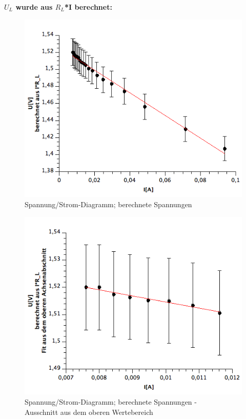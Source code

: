 \documentclass[12pt,a4paper]{article}
\begin{document}
\textbf{$U_L$ wurde aus $R_L$*I berechnet:}



\begin{figure}[H]
	\centering
	\includegraphics[scale=0.58]{./figure/Batterie_RI-I_mitFit.png}
	\caption{Spannung/Strom-Diagramm; berechnete Spannungen}
	\label{fig:Batterie_RI-I_mitFit}
\end{figure}



\begin{figure}[H]
	\centering
	\includegraphics[scale=0.58]{./figure/Batterie_RI-I_mitFit_Abschnitt.png}
	\caption{Spannung/Strom-Diagramm; berechnete Spannungen  - \\
	Ausschnitt aus dem oberen Wertebereich}
	\label{fig:Batterie_RI-I_mitFit_Abschnitt}
\end{figure}
\end{document}
